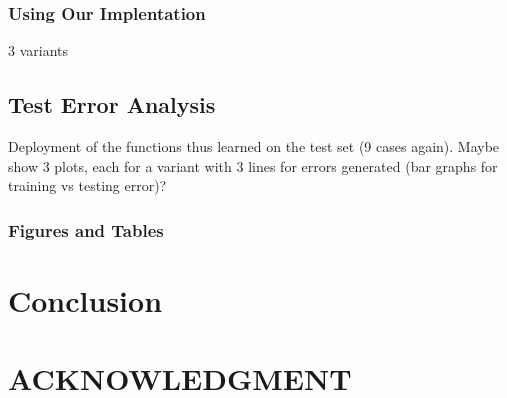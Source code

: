 \documentclass[letterpaper, 11 pt, conference]{ieeeconf}
\begin{document}
\subsubsection{Using Our Implentation}
3 variants

\subsection{Test Error Analysis}
Deployment of the functions thus learned on the test set (9 cases again). Maybe show 3 plots, each for a variant with 3 lines for errors generated (bar graphs for training vs testing error)?
\subsubsection{Figures and Tables}

\section{Conclusion}


\addtolength{\textheight}{-12cm}   


\section*{ACKNOWLEDGMENT}
\end{document}

